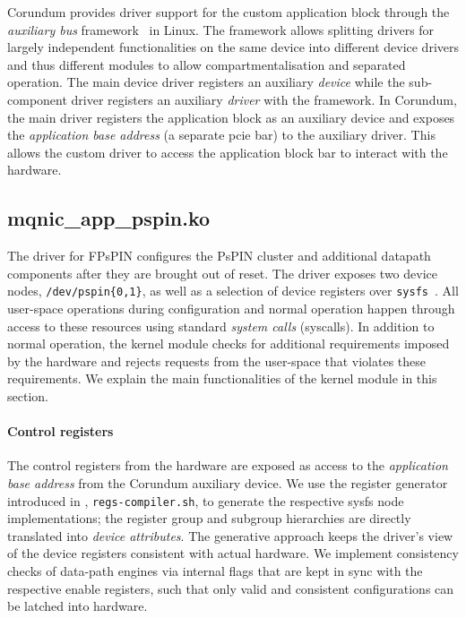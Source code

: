 Corundum provides driver support for the custom application block through the \emph{auxiliary bus} framework~\cite{noauthor_auxiliary_nodate} in Linux.  The framework allows splitting drivers for largely independent functionalities on the same device into different device drivers and thus different modules to allow compartmentalisation and separated operation.  The main device driver registers an auxiliary \emph{device} while the sub-component driver registers an auxiliary \emph{driver} with the framework.  In Corundum, the main driver registers the application block as an auxiliary device and exposes the \emph{application base address} (a separate \ac{pcie} \ac{bar}) to the auxiliary driver.  This allows the custom driver to access the application block \ac{bar} to interact with the hardware.

\subsection{mqnic\_\-app\_\-pspin.ko} \label{sec:app-kmod}

The driver for FPsPIN configures the PsPIN cluster and additional datapath components after they are brought out of reset.  The driver exposes two device nodes, \texttt{/dev/pspin\{0,1\}}, as well as a selection of device registers over \texttt{sysfs}~\cite{mochel_sysfs_2011}.  All user-space operations during configuration and normal operation happen through access to these resources using standard \emph{system calls} (syscalls).  In addition to normal operation, the kernel module checks for additional requirements imposed by the hardware and rejects requests from the user-space that violates these requirements.  We explain the main functionalities of the kernel module in this section.

\paragraph{Control registers} The control registers from the hardware are exposed as access to the \emph{application base address} from the Corundum auxiliary device.  We use the register generator introduced in , \texttt{regs-compiler.sh}, to generate the respective sysfs node implementations; the register group and subgroup hierarchies are directly translated into \emph{device attributes}.  The generative approach keeps the driver's view of the device registers consistent with actual hardware.  We implement consistency checks of data-path engines via internal flags that are kept in sync with the respective enable registers, such that only valid and consistent configurations can be latched into hardware.

